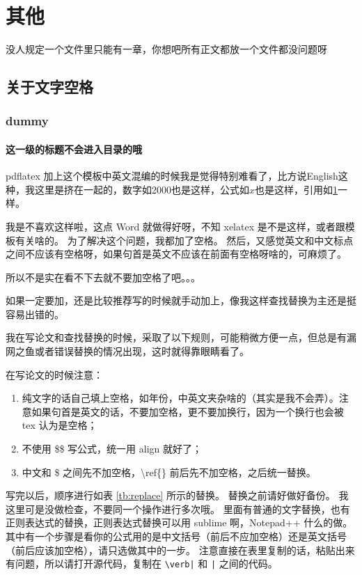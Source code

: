 

\chapter{其他}
\label{chp:others}

没人规定一个文件里只能有一章，你想吧所有正文都放一个文件都没问题呀

\section{关于文字空格}

\subsection{dummy}

\subsubsection{这一级的标题不会进入目录的哦}

pdflatex 加上这个模板中英文混编的时候我是觉得特别难看了，比方说English这种，我这里是挤在一起的，数字如2000也是这样，公式如$x$也是这样，引用如\ref{chp:others}一样。

我是不喜欢这样啦，这点 Word 就做得好呀，不知 xelatex 是不是这样，或者跟模板有关啥的。
为了解决这个问题，我都加了空格。
然后，又感觉英文和中文标点之间不应该有空格呀，如果句首是英文不应该在前面有空格呀啥的，可麻烦了。

{\hei \sanhao 所以不是实在看不下去就不要加空格了吧。。。}

如果一定要加，还是比较推荐写的时候就手动加上，像我这样查找替换为主还是挺容易出错的。

我在写论文和查找替换的时候，采取了以下规则，可能稍微方便一点，但总是有漏网之鱼或者错误替换的情况出现，这时就得靠眼睛看了。

在写论文的时候注意：
\begin{enumerate}[1. ]
    \item 纯文字的话自己填上空格，如年份，中英文夹杂啥的（其实是我不会弄）。注意如果句首是英文的话，不要加空格，更不要加换行，因为一个换行也会被 tex 认为是空格；
    \item 不使用 \$\$ 写公式，统一用 align 就好了；
    \item 中文和 \$ 之间先不加空格，\textbackslash ref\{\} 前后先不加空格，之后统一替换。
\end{enumerate}

写完以后，顺序进行如表 \ref{tb:replace} 所示的替换。
{\hei 替换之前请好做好备份}。
我这里可是没做检查，不要同一个操作进行多次哦。
里面有普通的文字替换，也有正则表达式的替换，正则表达式替换可以用 sublime 啊，Notepad++ 什么的做。
其中有一个步骤是看你的公式用的是中文括号（前后不应加空格）还是英文括号（前后应该加空格），请只选做其中的一步。
注意直接在表里复制的话，粘贴出来有问题，所以请打开源代码，复制在 \verb+\verb|+ 和 \verb+|+ 之间的代码。

